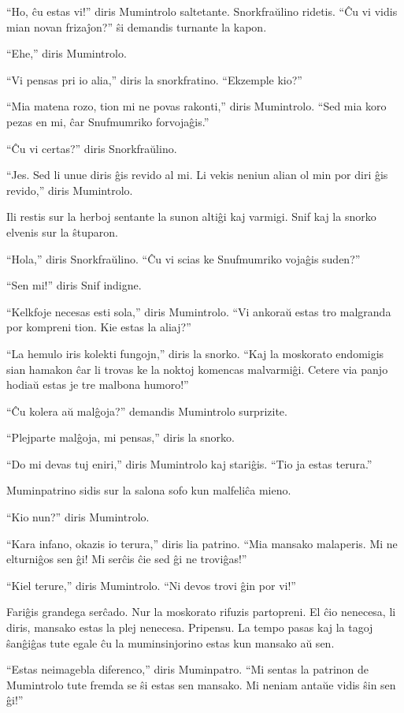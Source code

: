 ``Ho, ĉu estas vi!'' diris Mumintrolo saltetante. Snorkfraŭlino ridetis. ``Ĉu vi vidis mian novan frizaĵon?'' ŝi demandis turnante la kapon.

``Ehe,'' diris Mumintrolo.

``Vi pensas pri io alia,'' diris la snorkfratino. ``Ekzemple kio?''

``Mia matena rozo, tion mi ne povas rakonti,'' diris Mumintrolo. ``Sed mia koro pezas en mi, ĉar Snufmumriko forvojaĝis.''

``Ĉu vi certas?'' diris Snorkfraŭlino.

``Jes. Sed li unue diris ĝis revido al mi. Li vekis neniun alian ol min por diri ĝis revido,'' diris Mumintrolo.

Ili restis sur la herboj sentante la sunon altiĝi kaj varmigi. Snif kaj la snorko elvenis sur la ŝtuparon.

``Hola,'' diris Snorkfraŭlino. ``Ĉu vi scias ke Snufmumriko vojaĝis suden?''

``Sen mi!'' diris Snif indigne.

``Kelkfoje necesas esti sola,'' diris Mumintrolo. ``Vi ankoraŭ estas tro malgranda por kompreni tion. Kie estas la aliaj?''

``La hemulo iris kolekti fungojn,'' diris la snorko. ``Kaj la moskorato endomigis sian hamakon ĉar li trovas ke la noktoj komencas malvarmiĝi. Cetere via panjo hodiaŭ estas je tre malbona humoro!''

``Ĉu kolera aŭ malĝoja?'' demandis Mumintrolo surprizite.

``Plejparte malĝoja, mi pensas,'' diris la snorko.

``Do mi devas tuj eniri,'' diris Mumintrolo kaj stariĝis. ``Tio ja estas terura.''

Muminpatrino sidis sur la salona sofo kun malfeliĉa mieno.

``Kio nun?'' diris Mumintrolo.

``Kara infano, okazis io terura,'' diris lia patrino. ``Mia mansako malaperis. Mi ne elturniĝos sen ĝi! Mi serĉis ĉie sed ĝi ne troviĝas!''

``Kiel terure,'' diris Mumintrolo. ``Ni devos trovi ĝin por vi!''

Fariĝis grandega serĉado. Nur la moskorato rifuzis partopreni. El ĉio nenecesa, li diris, mansako estas la plej nenecesa. Pripensu. La tempo pasas kaj la tagoj ŝanĝiĝas tute egale ĉu la muminsinjorino estas kun mansako aŭ sen.

``Estas neimagebla diferenco,'' diris Muminpatro. ``Mi sentas la patrinon de Mumintrolo tute fremda se ŝi estas sen mansako. Mi neniam antaŭe vidis ŝin sen ĝi!''

